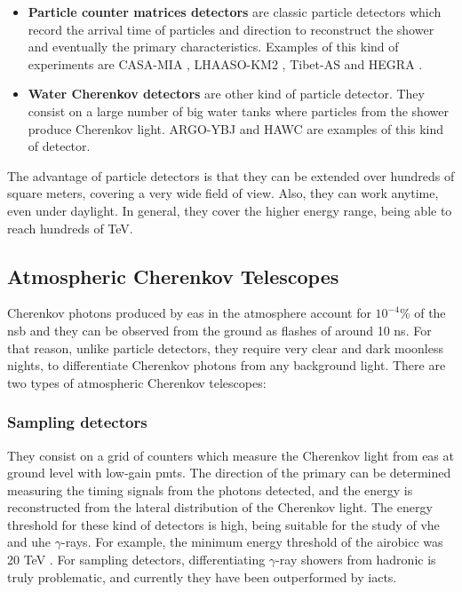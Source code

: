\documentclass[main.tex]{subfiles}
\begin{document}
\begin{itemize}
    \item \textbf{Particle counter matrices detectors} are classic particle detectors which record the arrival time of particles and direction to reconstruct the shower and eventually the primary characteristics. Examples of this kind of experiments are CASA-MIA \cite{casamia}, LHAASO-KM2 \cite{2016LHAASO}, Tibet-AS \cite{1990TibetAs} and HEGRA \cite{FONSECA1992HEGRA}.\\
    \item \textbf{Water Cherenkov detectors} are other kind of particle detector. They consist on a large number of big water tanks where particles from the shower produce Cherenkov light. ARGO-YBJ \cite{2015Argo} and HAWC \cite{2014HAWC} are examples of this kind of detector.\\

\end{itemize}
The advantage of particle detectors is that they can be extended over hundreds of square meters, covering a very wide field of view. Also, they can work anytime, even under daylight. In general, they cover the higher energy range, being able to reach hundreds of TeV.

\subsection{Atmospheric Cherenkov Telescopes}

Cherenkov photons produced by \gls{eas} in the atmosphere account for $10^{-4}$\% of the \gls{nsb} and they can be observed from the ground as flashes of around 10 ns. For that reason, unlike particle detectors, they require very clear and dark moonless nights, to differentiate Cherenkov photons from any background light. There are two types of atmospheric Cherenkov telescopes:  

\subsubsection{Sampling detectors}

They consist on a grid of counters which measure the Cherenkov light from \gls{eas} at ground level with low-gain \glspl{pmt}. The direction of the primary can be determined measuring the timing signals from the photons detected, and the energy is reconstructed from the lateral distribution of the Cherenkov light. The energy threshold for these kind of detectors is high, being suitable for the study of \gls{vhe} and \gls{uhe} $\gamma$-rays. For example, the minimum energy threshold of the \gls{airobicc} was 20 TeV \cite{1996AIROBICC}. For sampling detectors, differentiating $\gamma$-ray showers from hadronic is truly problematic, and currently they have been outperformed by \glspl{iact}. 
\end{document}

